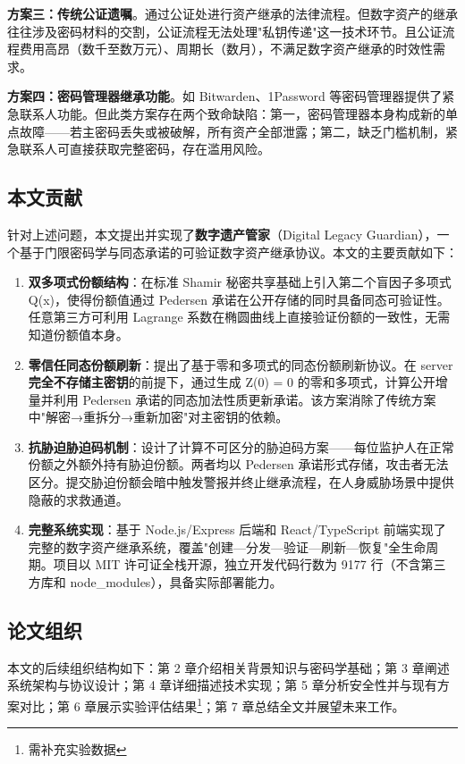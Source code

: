 \textbf{方案三：传统公证遗嘱}。通过公证处进行资产继承的法律流程。但数字资产的继承往往涉及密码材料的交割，公证流程无法处理"私钥传递"这一技术环节。且公证流程费用高昂（数千至数万元）、周期长（数月），不满足数字资产继承的时效性需求。

\textbf{方案四：密码管理器继承功能}。如 Bitwarden、1Password 等密码管理器提供了紧急联系人功能。但此类方案存在两个致命缺陷：第一，密码管理器本身构成新的单点故障——若主密码丢失或被破解，所有资产全部泄露；第二，缺乏门槛机制，紧急联系人可直接获取完整密码，存在滥用风险。

\subsection{本文贡献}

针对上述问题，本文提出并实现了\textbf{数字遗产管家}（Digital Legacy Guardian），一个基于门限密码学与同态承诺的可验证数字资产继承协议。本文的主要贡献如下：

\begin{enumerate}[label=(\arabic*)]
    \item \textbf{双多项式份额结构}：在标准 Shamir 秘密共享基础上引入第二个盲因子多项式 Q(x)，使得份额值通过 Pedersen 承诺在公开存储的同时具备同态可验证性。任意第三方可利用 Lagrange 系数在椭圆曲线上直接验证份额的一致性，无需知道份额值本身。

    \item \textbf{零信任同态份额刷新}：提出了基于零和多项式的同态份额刷新协议。在 server \textbf{完全不存储主密钥}的前提下，通过生成 Z(0) = 0 的零和多项式，计算公开增量并利用 Pedersen 承诺的同态加法性质更新承诺。该方案消除了传统方案中"解密→重拆分→重新加密"对主密钥的依赖。

    \item \textbf{抗胁迫胁迫码机制}：设计了计算不可区分的胁迫码方案——每位监护人在正常份额之外额外持有胁迫份额。两者均以 Pedersen 承诺形式存储，攻击者无法区分。提交胁迫份额会暗中触发警报并终止继承流程，在人身威胁场景中提供隐蔽的求救通道。

    \item \textbf{完整系统实现}：基于 Node.js/Express 后端和 React/TypeScript 前端实现了完整的数字资产继承系统，覆盖"创建—分发—验证—刷新—恢复"全生命周期。项目以 MIT 许可证全栈开源，独立开发代码行数为 9177 行（不含第三方库和 node\_modules），具备实际部署能力。
\end{enumerate}

\subsection{论文组织}

本文的后续组织结构如下：第 2 章介绍相关背景知识与密码学基础；第 3 章阐述系统架构与协议设计；第 4 章详细描述技术实现；第 5 章分析安全性并与现有方案对比；第 6 章展示实验评估结果\footnote{需补充实验数据}；第 7 章总结全文并展望未来工作。
